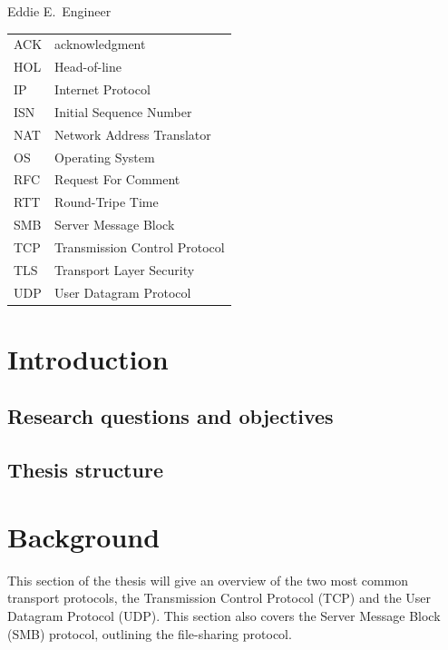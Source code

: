 \documentclass[english, 12pt, a4paper, elec, utf8, a-2b, online]{aaltothesis}
\begin{document}
\vspace{5mm}
{\hfill Eddie E.\ Engineer \hspace{1cm}}

\newpage


\thesistableofcontents



\begin{tabular}{ll}
ACK & acknowledgment \\
HOL & Head-of-line \\
IP & Internet Protocol \\
ISN & Initial Sequence Number \\
NAT & Network Address Translator \\
OS & Operating System \\
RFC & Request For Comment \\
RTT & Round-Tripe Time \\
SMB & Server Message Block \\
TCP & Transmission Control Protocol \\
TLS & Transport Layer Security \\
UDP & User Datagram Protocol \\
\end{tabular}


\cleardoublepage

\section{Introduction}
\label{sec:intro}

\thispagestyle{empty}

\subsection{Research questions and objectives}


\subsection{Thesis structure}

\clearpage

\section{Background}
This section of the thesis will give an overview of the two most common transport
protocols, the Transmission Control Protocol (TCP) and the User Datagram Protocol (UDP).
This section also covers the Server Message Block (SMB) protocol, outlining the
file-sharing protocol.
\end{document}
